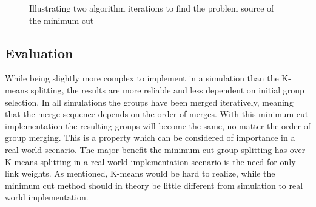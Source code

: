 \begin{figure}
	\centering
		\qquad
		\caption{Illustrating two algorithm iterations to find the problem source of the minimum cut}%
		\label{fig:mincutbug}%
\end{figure}




\subsection{Evaluation}
While being slightly more complex to implement in a simulation than the K-means splitting, the results are more reliable and less dependent on 
initial group selection. In all simulations the groups have been merged iteratively, meaning that the merge sequence depends
on the order of merges. With this minimum cut implementation the resulting groups will become the same, no matter the order
of group merging. This is a property which can be considered of importance in a real world scenario. The major benefit 
the minimum cut group splitting has over K-means splitting in a real-world implementation scenario is the need for only link weights.
As mentioned, K-means would be hard to realize, while the minimum cut method should in theory be little different from simulation 
to real world implementation. 


